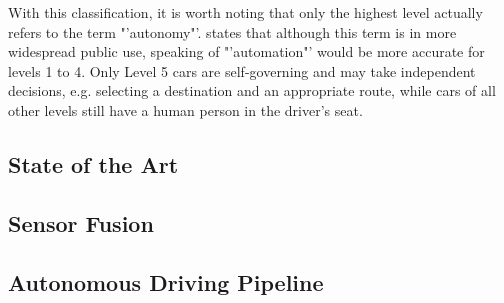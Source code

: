 With this classification, it is worth noting that only the highest level actually refers to the term "'autonomy"'. \cite{wood2012potential} states that although this term is in more widespread public use, speaking of "'automation"' would be more accurate for levels 1 to 4. Only Level 5 cars are self-governing and may take independent decisions, e.g. selecting a destination and an appropriate route, while cars of all other levels still have a human person in the driver's seat.

\subsection{State of the Art}
\label{subsec:background:state_of_the_art}

\subsection{Sensor Fusion}
\label{subsec:background:sensor_fusion}

\subsection{Autonomous Driving Pipeline}
\label{subsec:background:autonomous_driving_pipeline}
